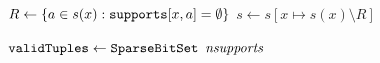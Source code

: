        \label{line:init:12}
         \STATE $R \leftarrow \left\{a \in s(x) : \texttt{supports}[x,a] = \emptyset\right\}$
         \STATE $s \leftarrow s[x \mapsto s(x) \setminus R]$ \label{line:init:14}          
               \RETURN{$\emptyset$} \label{line:init:wipeout}
         \ENDIF
          
      \ENDFOREACH
      \STATE $\texttt{validTuples} \leftarrow \texttt{SparseBitSet}$  $\mathit{nsupports}$  \label{line:init:15}
